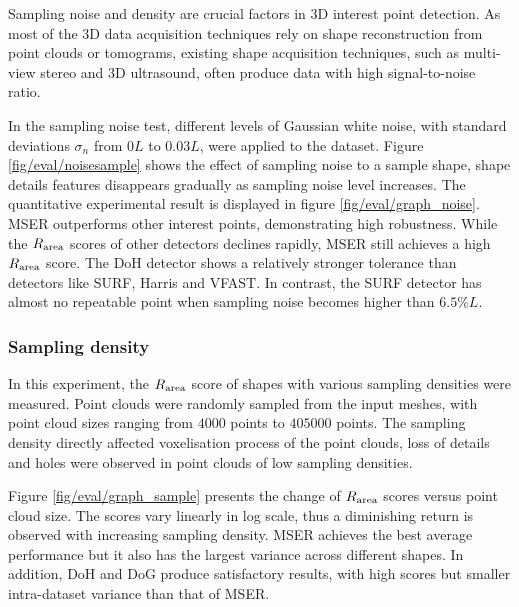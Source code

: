 Sampling noise and density are crucial factors in 3D interest point detection. As most of the 3D data acquisition techniques rely on shape reconstruction from point clouds or tomograms, existing shape acquisition techniques, such as multi-view stereo and 3D ultrasound, often produce data with high signal-to-noise ratio. 

In the sampling noise test, different levels of Gaussian white noise, with standard deviations $\sigma_{n}$ from $0L$ to $0.03L$, were applied to the \meshset dataset. Figure \ref{fig/eval/noisesample} shows the effect of sampling noise to a sample shape, shape details features disappears gradually as sampling noise level increases. 
The quantitative experimental result is displayed in figure \ref{fig/eval/graph_noise}. MSER outperforms other interest points, demonstrating high robustness. While the $R_\textrm{area}$ scores of other detectors declines rapidly, MSER still achieves a high $R_\textrm{area}$ score. The DoH detector shows a relatively stronger tolerance than detectors like SURF, Harris and VFAST. In contrast, the SURF detector has almost no repeatable point when sampling noise becomes higher than $6.5\%L$.

\subsubsection{Sampling density}

In this experiment, the $R_\textrm{area}$ score of shapes with various sampling densities were measured. Point clouds were randomly sampled from the input meshes, with point cloud sizes ranging from $4000$ points to $405000$ points. The sampling density directly affected voxelisation process of the point clouds, loss of details and holes were observed in point clouds of low sampling densities. 

Figure \ref{fig/eval/graph_sample} presents the change of $R_\textrm{area}$ scores versus point cloud size. The scores vary linearly in log scale, thus a diminishing return is observed with increasing sampling density. MSER achieves the best average performance but it also has the largest variance across different shapes. In addition, DoH and DoG produce satisfactory results, with high scores but smaller intra-dataset variance than that of MSER.

